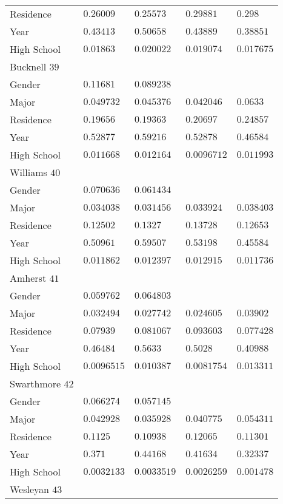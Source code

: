 \begin{center}
\begin{longtable}{|l|l|l|l|l|}
Residence & $0.26009$ & $0.25573$ & $0.29881$ & $0.298$ \\
Year & $0.43413$ & $0.50658$ & $0.43889$ & $0.38851$ \\
High School & $0.01863$ & $0.020022$ & $0.019074$ & $0.017675$ \\ \hline \hline
Bucknell $39$ & & &   \\ \hline
Gender & $0.11681$ & $0.089238$ & & \\
Major & $0.049732$ & $0.045376$ & $0.042046$ & $0.0633$ \\
Residence & $0.19656$ & $0.19363$ & $0.20697$ & $0.24857$ \\
Year & $0.52877$ & $0.59216$ & $0.52878$ & $0.46584$ \\
High School & $0.011668$ & $0.012164$ & $0.0096712$ & $0.011993$ \\ \hline \hline
Williams $40$ & & &   \\ \hline
Gender & $0.070636$ & $0.061434$ & & \\
Major & $0.034038$ & $0.031456$ & $0.033924$ & $0.038403$ \\
Residence & $0.12502$ & $0.1327$ & $0.13728$ & $0.12653$ \\
Year & $0.50961$ & $0.59507$ & $0.53198$ & $0.45584$ \\
High School & $0.011862$ & $0.012397$ & $0.012915$ & $0.011736$ \\ \hline \hline
Amherst $41$ & & &   \\ \hline
Gender & $0.059762$ & $0.064803$ & & \\
Major & $0.032494$ & $0.027742$ & $0.024605$ & $0.03902$ \\
Residence & $0.07939$ & $0.081067$ & $0.093603$ & $0.077428$ \\
Year & $0.46484$ & $0.5633$ & $0.5028$ & $0.40988$ \\
High School & $0.0096515$ & $0.010387$ & $0.0081754$ & $0.013311$ \\ \hline \hline
Swarthmore $42$ & & &   \\ \hline
Gender & $0.066274$ & $0.057145$ & & \\
Major & $0.042928$ & $0.035928$ & $0.040775$ & $0.054311$ \\
Residence & $0.1125$ & $0.10938$ & $0.12065$ & $0.11301$ \\
Year & $0.371$ & $0.44168$ & $0.41634$ & $0.32337$ \\
High School & $0.0032133$ & $0.0033519$ & $0.0026259$ & $0.001478$ \\ \hline \hline
Wesleyan $43$ & & &   \\ \hline

\end{longtable}
\end{center}
